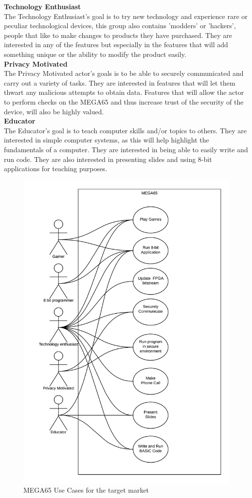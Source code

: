 \textbf{Technology Enthusiast}\\
The Technology Enthusiast's goal is to try new technology and experience rare or peculiar technological devices, this group also contains 'modders' or 'hackers', people that like to make changes to products they have purchased. They are interested in any of the features but especially in the features that will add something unique or the ability to modify the product easily.\\

\textbf{Privacy Motivated}\\
The Privacy Motivated actor's goals is to be able to securely communicated and carry out a variety of tasks. They are interested in features that will let them thwart any malicious attempts to obtain data. Features that will allow the actor to perform checks on the MEGA65 and thus increase trust of the security of the device, will also be highly valued. \\

\textbf{Educator}\\
The Educator's goal is to teach computer skills and/or topics to others. They are interested in simple computer systems, as this will help highlight the fundamentals of a computer. They are interested in being able to easily write and run code. They are also interested in presenting slides and using 8-bit applications for teaching purposes.\\

\begin{figure} \begin{center}
\includegraphics[width=.6\linewidth]{pics/MEGA65_use_case} 
\end{center} 
\caption{MEGA65 Use Cases for the target market\\}
\label{MEGA65_use_cases}
\end{figure}

